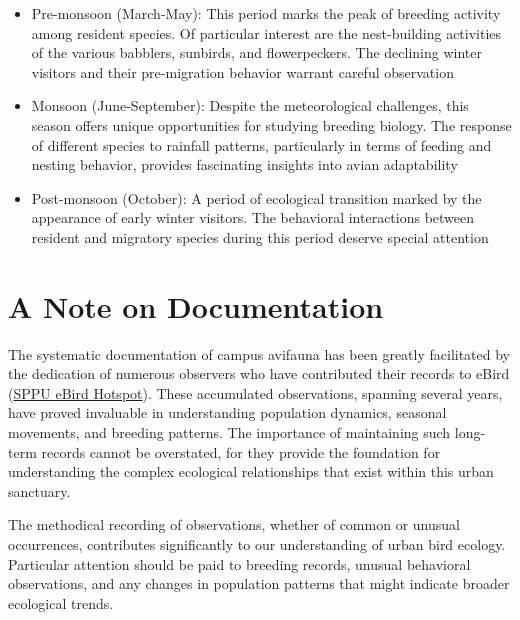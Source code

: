 \documentclass[a4paper,12pt,landscape]{memoir}
\begin{document}
{\begin{itemize}
  \item Pre-monsoon (March-May): This period marks the peak of breeding activity among resident species. Of particular interest are the nest-building activities of the various babblers, sunbirds, and flowerpeckers. The declining winter visitors and their pre-migration behavior warrant careful observation
  
  \item Monsoon (June-September): Despite the meteorological challenges, this season offers unique opportunities for studying breeding biology. The response of different species to rainfall patterns, particularly in terms of feeding and nesting behavior, provides fascinating insights into avian adaptability
  
  \item Post-monsoon (October): A period of ecological transition marked by the appearance of early winter visitors. The behavioral interactions between resident and migratory species during this period deserve special attention
  \end{itemize}
}{%
  \section*{A Note on Documentation}
  The systematic documentation of campus avifauna has been greatly facilitated by the dedication of numerous observers who have contributed their records to eBird (\href{https://ebird.org/hotspot/L1838309}{SPPU eBird Hotspot}). These accumulated observations, spanning several years, have proved invaluable in understanding population dynamics, seasonal movements, and breeding patterns. The importance of maintaining such long-term records cannot be overstated, for they provide the foundation for understanding the complex ecological relationships that exist within this urban sanctuary.

  The methodical recording of observations, whether of common or unusual occurrences, contributes significantly to our understanding of urban bird ecology. Particular attention should be paid to breeding records, unusual behavioral observations, and any changes in population patterns that might indicate broader ecological trends.
}
\end{document}
